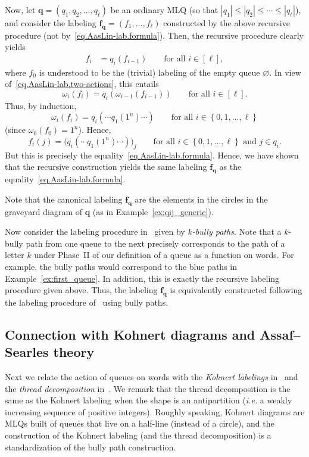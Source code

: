\documentclass[reqno]{amsart}
\newcommand{\0}{\phantom{c}}
\newcommand{\ff}{\mathbf{f}}
\newcommand{\qq}{\mathbf{q}}
\newenvironment{verlong}{}{}
\newcommand{\set}[1]{\left\{ #1 \right\}}
\newcommand{\abs}[1]{\left| #1 \right|}
\newcommand{\tup}[1]{\left( #1 \right)}
\newcommand{\ive}[1]{\left[ #1 \right]}
\newcommand{\defn}[1]{{\color{darkred}\emph{#1}}} %
\theoremstyle{plain}
\theoremstyle{definition}
\numberwithin{equation}{section}
\begin{document}
\begin{verlong}
Now, let $\qq = (q_1, q_2, \dotsc, q_{\ell})$ be an ordinary MLQ
(so that $\abs{q_1} \leq \abs{q_2} \leq \cdots \leq \abs{q_{\ell}}$),
and consider the labeling $\ff_\qq = (f_1, \dotsc, f_{\ell})$ constructed by the above recursive procedure
(not by~\eqref{eq.AasLin-lab.formula}).
Then, the recursive procedure clearly yields
\begin{align*}
f_i &= q_i \tup{ f_{i-1} } \qquad \text{for all } i \in \ive{\ell} ,
\end{align*}
where $f_0$ is understood to be the (trivial) labeling of the empty queue $\varnothing$.
In view of~\eqref{eq.AasLin-lab.two-actions}, this entails
\[
\omega_i \tup{ f_i } = q_i \tup{ \omega_{i-1} \tup{ f_{i-1} } } \qquad \text{for all } i \in \ive{\ell} .
\]
Thus, by induction,
\[
\omega_i \tup{ f_i } = q_i( \cdots q_1(1^n) \cdots )
 \qquad \text{for all } i \in \set{0, 1, \dotsc, \ell}
\]
(since $\omega_0 \tup{ f_0 } = 1^n$).
Hence,
\[
f_i(j) = \bigl( q_i( \cdots q_1(1^n) \cdots ) \bigr)_j
 \qquad \text{for all } i \in \set{0, 1, \dotsc, \ell}
        \text{ and } j \in q_i .
\]
But this is precisely the equality~\eqref{eq.AasLin-lab.formula}.
Hence, we have shown that the recursive construction yields the same labeling $\ff_\qq$ as the equality~\eqref{eq.AasLin-lab.formula}.

\end{verlong}
%
Note that the canonical labeling $\ff_{\qq}$ are the elements in the circles in the graveyard diagram of $\qq$ (as in Example~\ref{ex:qij_generic}).

Now consider the labeling procedure in~\cite[\S 2.2]{AasLin17} given by \defn{$k$-bully paths}.
Note that a $k$-bully path from one queue to the next precisely corresponds to the path of a letter $k$ under Phase~II of our definition of a queue as a function on words.
For example, the bully paths would correspond to the blue paths in Example~\ref{ex:first_queue}.
In addition, this is exactly the recursive labeling procedure given above.
Thus, the labeling $\ff_{\qq}$ is equivalently constructed following the labeling procedure of~\cite{AasLin17} using bully paths.


\subsection{Connection with Kohnert diagrams and Assaf--Searles theory}

Next we relate the action of queues on words with the \defn{Kohnert labelings} in~\cite[Def.~2.5]{AssSea18} and the \defn{thread decomposition} in~\cite[Def.~3.5]{AssSea18}.
We remark that the thread decomposition is the same as the Kohnert labeling when the shape is an antipartition (\textit{i.e.} a weakly increasing sequence of positive integers).
Roughly speaking, Kohnert diagrams are MLQs built of queues that live on a half-line (instead of a circle), and the construction of the Kohnert labeling (and the thread decomposition) is a standardization of the bully path construction.
\end{document}
